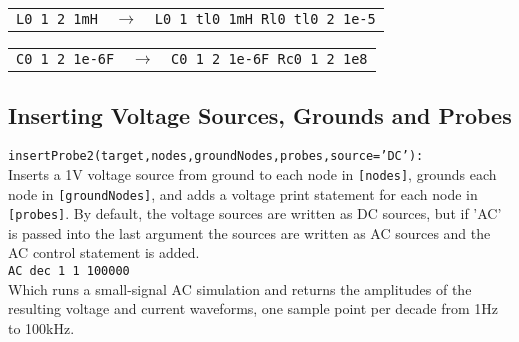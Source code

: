 \begin{tabular}{ c c  p{3cm} }
\texttt{L0 1 2 1mH} & $\rightarrow$ & \texttt{L0 1 tl0 1mH Rl0 tl0 2 1e-5} \\
\end{tabular}
\begin{tabular}{ |c  c  p{3cm} }
\texttt{C0 1 2 1e-6F} & $\rightarrow$ & \texttt{C0 1 2 1e-6F Rc0 1 2 1e8} \\
\end{tabular}

\subsection{Inserting Voltage Sources, Grounds and Probes}
\texttt{insertProbe2(target,nodes,groundNodes,probes,source='DC'):}\\
Inserts a 1V voltage source from ground to each node in \texttt{[nodes]}, grounds each node in \texttt{[groundNodes]}, and adds a voltage print statement for each node in \texttt{[probes]}.
By default, the voltage sources are written as DC sources, but if 'AC' is passed into the last argument the sources are written as AC sources and the AC control statement is added.\\
\texttt{AC dec 1 1 100000}\\
Which runs a small-signal AC simulation and returns the amplitudes of the resulting voltage and current waveforms, one sample point per decade from 1Hz to 100kHz.

